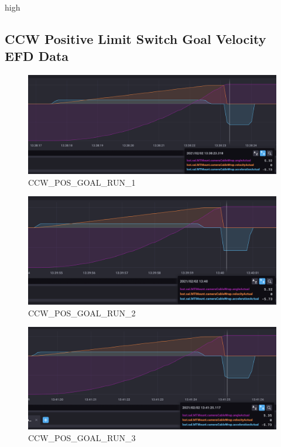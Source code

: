 high\documentclass[SE,lsstdraft,authoryear,toc]{lsstdoc}
\begin{document}
\subsection{CCW Positive Limit Switch Goal Velocity EFD Data}
\begin{figure}[h!]
  \includegraphics[width=\linewidth]{media/CCW_high_speed_pos_test1.png}
  \caption{CCW\_POS\_GOAL\_RUN\_1}
  \label{fig:CCW_POS_GOAL_RUN_1}
\end{figure}
\begin{figure}[h!]
  \includegraphics[width=\linewidth]{media/CCW_high_speed_pos_test2.png}
  \caption{CCW\_POS\_GOAL\_RUN\_2}
  \label{fig:CCW_POS_GOAL_RUN_2}
\end{figure}
\begin{figure}[h!]
  \includegraphics[width=\linewidth]{media/CCW_high_speed_pos_test3.png}
  \caption{CCW\_POS\_GOAL\_RUN\_3}
  \label{fig:CCW_POS_GOAL_RUN_3}
\end{figure}
\end{document}
